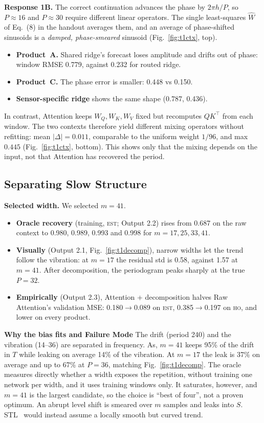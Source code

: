 \documentclass[11pt,a4paper]{article}
\newcommand{\est}{\textsc{est}}   %
\newcommand{\ho}{\textsc{ho}}     %
\begin{document}
\noindent\textbf{Response 1B.} The correct continuation advances the phase by $2\pi h/P$, so $P\approx16$ and $P\approx30$ require different linear operators. The single least-squares $\widehat W$ of Eq.~(8) in the handout averages them, and an average of phase-shifted sinusoids is a \emph{damped, phase-smeared} sinusoid (Fig.~\ref{fig:t1ctx}, top).
\begin{itemize}
  \item \textbf{Product~A.} Shared ridge's forecast loses amplitude and drifts out of phase: window RMSE 0.779, against 0.232 for routed ridge.
  \item \textbf{Product~C.} The phase error is smaller: 0.448 vs 0.150.
  \item \textbf{Sensor-specific ridge} shows the same shape (0.787, 0.436).
\end{itemize}
In contrast, Attention keeps $W_Q,W_K,W_V$ fixed but recomputes $QK^\top$ from each window. The two contexts therefore yield different mixing operators without refitting: mean $|\Delta|=0.011$, comparable to the uniform weight $1/96$, and max $0.445$ (Fig.~\ref{fig:t1ctx}, bottom). This shows only that the mixing depends on the input, not that Attention has recovered the period.

\subsection{Separating Slow Structure}
\textbf{Selected width.} We selected $m=41$.
\begin{itemize}
  \item \textbf{Oracle recovery} (training, \est; Output 2.2) rises from 0.687 on the raw context to 0.980, 0.989, 0.993 and 0.998 for $m=17,25,33,41$.
  \item \textbf{Visually} (Output 2.1, Fig.~\ref{fig:t1decomp}), narrow widths let the trend follow the vibration: at $m=17$ the residual std is 0.58, against 1.57 at $m=41$. After decomposition, the periodogram peaks sharply at the true $P=32$.
  \item \textbf{Empirically} (Output 2.3), Attention + decomposition halves Raw Attention's validation MSE: 0.180$\to$0.089 on \est, 0.385$\to$0.197 on \ho, and lower on every product.
\end{itemize}

\noindent\textbf{Why the bias fits and Failure Mode} The drift (period 240) and the vibration (14--36) are separated in frequency. As, $m=41$ keeps 95\% of the drift in $T$ while leaking on average 14\% of the vibration. At $m=17$ the leak is 37\% on average and up to 67\% at $P=36$, matching Fig.~\ref{fig:t1decomp}. The oracle measures directly whether a width exposes the repetition, without training one network per width, and it uses training windows only. It saturates, however, and $m=41$ is the largest candidate, so the choice is ``best of four'', not a proven optimum. An abrupt level shift is smeared over $m$ samples and leaks into $S$. STL~\cite{cleveland1990} would instead assume a locally smooth but curved trend.
\end{document}
